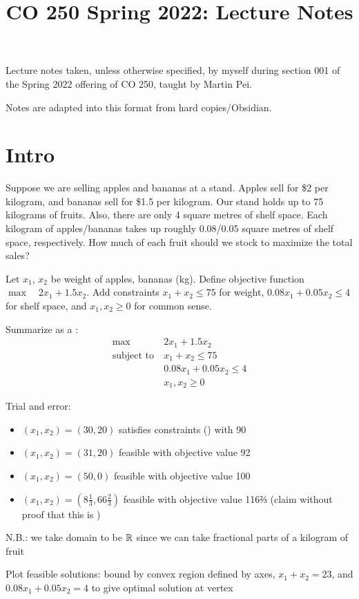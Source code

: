 \documentclass[class=co250,tikz,notes]{agony}
\title{CO 250 Spring 2022: Lecture Notes}
\begin{document}
\renewcommand{\contentsname}{CO 250 Spring 2022:\\{\huge Lecture Notes}}
\thispagestyle{firstpage}
\tableofcontents

Lecture notes taken, unless otherwise specified,
by myself during section 001 of the Spring 2022 offering of CO 250,
taught by Martin Pei.

Notes are adapted into this format from hard copies/Obsidian.

\begin{multicols}{2}
  \listoflecture
\end{multicols}

\chapter{Intro}

\begin{example}
  Suppose we are selling apples and bananas at a stand.
  Apples sell for \$2 per kilogram, and bananas sell for \$1.5 per kilogram.
  Our stand holds up to 75 kilograms of fruits.
  Also, there are only 4 square metres of shelf space.
  Each kilogram of apples/bananas takes up roughly 0.08/0.05 square metres of shelf space, respectively.
  How much of each fruit should we stock to maximize the total sales?
\end{example}
\begin{sol}
  Let $x_1$, $x_2$ be weight of apples, bananas (kg).
  Define objective function $\max\quad 2x_1 + 1.5x_2$.
  Add constraints $x_1 + x_2 \leq 75$ for weight, $0.08x_1 + 0.05x_2 \leq 4$ for shelf space, and $x_1, x_2 \geq 0$ for common sense.

  Summarize as a :
  \begin{align*}
    \max\               & 2x_1 + 1.5x_2            \\
    \text{subject to}\  & x_1 + x_2 \leq 75        \\
                        & 0.08x_1 + 0.05x_2 \leq 4 \\
                        & x_1, x_2 \geq 0
  \end{align*}

  Trial and error:
  \begin{itemize}[nosep]
    \item $(x_1, x_2) = (30, 20)$ satisfies constraints () with  90
    \item $(x_1, x_2) = (31, 20)$ feasible with objective value 92
    \item $(x_1, x_2) = (50, 0)$ feasible with objective value 100
    \item $(x_1, x_2) = (8\frac13, 66\frac23)$ feasible with objective value 116⅔ (claim without proof that this is )
  \end{itemize}

  N.B.: we take domain to be $\mathbb{R}$ since we can take fractional parts of a kilogram of fruit

  Plot feasible solutions: bound by convex region defined by axes, $x_1 + x_2 = 23$, and $0.08x_1 + 0.05x_2 = 4$ to give optimal solution at vertex
\end{sol}
\end{document}
